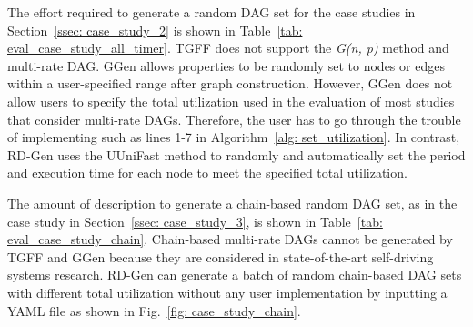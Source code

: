 The effort required to generate a random DAG set for the case studies in Section~\ref{ssec: case_study_2} is shown in Table~\ref{tab: eval_case_study_all_timer}.
TGFF does not support the {\it G(n, p)} method and multi-rate DAG.
GGen allows properties to be randomly set to nodes or edges within a user-specified range after graph construction.
However, GGen does not allow users to specify the total utilization used in the evaluation of most studies that consider multi-rate DAGs.
Therefore, the user has to go through the trouble of implementing such as lines 1-7 in Algorithm~\ref{alg: set_utilization}.
In contrast, RD-Gen uses the UUniFast method to randomly and automatically set the period and execution time for each node to meet the specified total utilization.


\begin{table}[tb]
    \centering
    \caption{Effort required to generate random DAG sets \\ for {\it Case Study 3} \cite{tang2020response, choi2021picas}}
    \label{tab: eval_case_study_chain}
    \renewcommand{\arraystretch}{1.2}
\end{table}


The amount of description to generate a chain-based random DAG set, as in the case study in Section~\ref{ssec: case_study_3}, is shown in Table~\ref{tab: eval_case_study_chain}.
Chain-based multi-rate DAGs cannot be generated by TGFF and GGen because they are considered in state-of-the-art self-driving systems research.
RD-Gen can generate a batch of random chain-based DAG sets with different total utilization without any user implementation by inputting a YAML file as shown in Fig.~\ref{fig: case_study_chain}.

